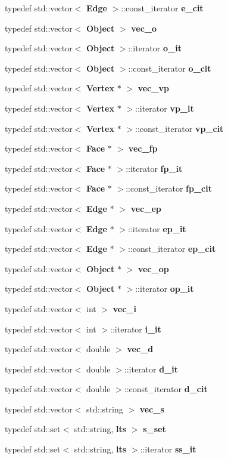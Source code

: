 \begin{CompactItemize}
\item 
typedef std::vector$<$ {\bf Edge} $>$::const\_\-iterator {\bf e\_\-cit}
\item 
typedef std::vector$<$ {\bf Object} $>$ {\bf vec\_\-o}
\item 
typedef std::vector$<$ {\bf Object} $>$::iterator {\bf o\_\-it}
\item 
typedef std::vector$<$ {\bf Object} $>$::const\_\-iterator {\bf o\_\-cit}
\item 
typedef std::vector$<$ {\bf Vertex} $\ast$ $>$ {\bf vec\_\-vp}
\item 
typedef std::vector$<$ {\bf Vertex} $\ast$ $>$::iterator {\bf vp\_\-it}
\item 
typedef std::vector$<$ {\bf Vertex} $\ast$ $>$::const\_\-iterator {\bf vp\_\-cit}
\item 
typedef std::vector$<$ {\bf Face} $\ast$ $>$ {\bf vec\_\-fp}
\item 
typedef std::vector$<$ {\bf Face} $\ast$ $>$::iterator {\bf fp\_\-it}
\item 
typedef std::vector$<$ {\bf Face} $\ast$ $>$::const\_\-iterator {\bf fp\_\-cit}
\item 
typedef std::vector$<$ {\bf Edge} $\ast$ $>$ {\bf vec\_\-ep}
\item 
typedef std::vector$<$ {\bf Edge} $\ast$ $>$::iterator {\bf ep\_\-it}
\item 
typedef std::vector$<$ {\bf Edge} $\ast$ $>$::const\_\-iterator {\bf ep\_\-cit}
\item 
typedef std::vector$<$ {\bf Object} $\ast$ $>$ {\bf vec\_\-op}
\item 
typedef std::vector$<$ {\bf Object} $\ast$ $>$::iterator {\bf op\_\-it}
\item 
typedef std::vector$<$ int $>$ {\bf vec\_\-i}
\item 
typedef std::vector$<$ int $>$::iterator {\bf i\_\-it}
\item 
typedef std::vector$<$ double $>$ {\bf vec\_\-d}
\item 
typedef std::vector$<$ double $>$::iterator {\bf d\_\-it}
\item 
typedef std::vector$<$ double $>$::const\_\-iterator {\bf d\_\-cit}
\item 
typedef std::vector$<$ std::string $>$ {\bf vec\_\-s}
\item 
typedef std::set$<$ std::string, {\bf lts} $>$ {\bf s\_\-set}
\item 
typedef std::set$<$ std::string, {\bf lts} $>$::iterator {\bf ss\_\-it}
\item 

\end{CompactItemize}
